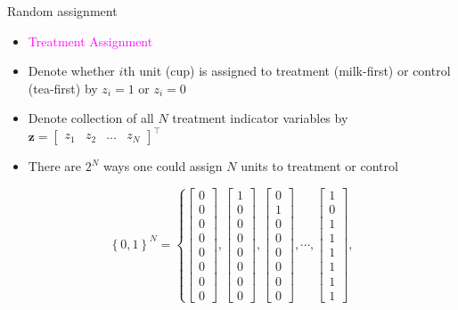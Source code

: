 \documentclass[table, xcolor = {dvipsnames}, 9pt]{beamer}
\theoremstyle{plain}
\begin{document}
\begin{frame}{Random assignment}
\vfill
\begin{itemize} \vfill
\item \textcolor{magenta}{Treatment Assignment} \vfill
\item[] Denote whether $i$th unit (cup) is assigned to treatment (milk-first) or control (tea-first) by $z_i = 1$ or $z_i = 0$ \vfill
\item[] Denote collection of all $N$ treatment indicator variables by \\ $\bm{z} = \begin{bmatrix} z_1 & z_2 & \ldots & z_N \end{bmatrix}^{\top}$ \vfill
\item[] There are $2^N$ ways one could assign $N$ units to treatment or control \vfill
\end{itemize} \vfill
\begin{equation}
\left\{0, 1\right\}^N = \left\{
\begin{bmatrix} 0 \\ 0 \\ 0 \\ 0 \\ 0 \\ 0 \\ 0 \\ 0 \end{bmatrix},
\begin{bmatrix} 1 \\ 0 \\ 0 \\ 0 \\ 0 \\ 0 \\ 0 \\ 0 \end{bmatrix},
\begin{bmatrix} 0 \\ 1 \\ 0 \\ 0 \\ 0 \\ 0 \\ 0 \\ 0 \end{bmatrix},
\cdots ,
\begin{bmatrix} 1 \\ 0 \\ 1 \\ 1 \\ 1 \\ 1 \\ 1 \\ 1 \end{bmatrix},

\end{equation}
\end{frame}
\end{document}
